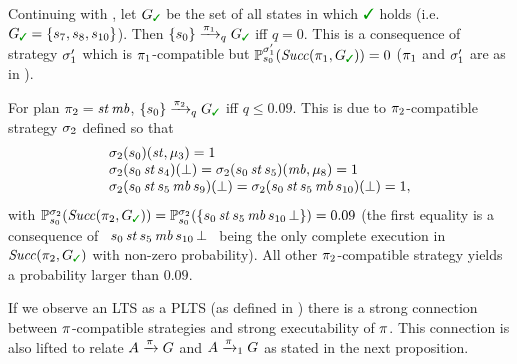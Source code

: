 \begin{example}\label{ex:running:plan-exec}
  Continuing with , let
  $G_{\goal}$
  be the set of all states in which $\goal$ holds (i.e. $G_{\goal} = \{s_7, s_8, s_{10}\}$).
  Then $\{s_0\}\reach{\plan_1}_qG_{\goal}$ iff $q=0$. This
  is a consequence of strategy $\sigma'_1$ which is
  $\pi_1$-compatible but
  $\Prob^{\strat'_1}_{s_0}(\Succ(\plan_1,G_{\goal}))=0$ ($\pi_1$ and
  $\sigma'_1$ are as in ).

  For plan $\pi_2 = \mathit{st}\,\mathit{mb}$,
  $\{s_0\}\reach{\plan_2}_qG_{\goal}$ iff $q\leq0.09$.  This is due to
  $\pi_2$-compatible strategy $\sigma_2$ defined so that
  \[
  \begin{array}{l}
    \sigma_2(s_0)(\mathit{st},\mu_3)=1\\
    \sigma_2(s_0\,\mathit{st}\,s_4)(\bot)=
    \sigma_2(s_0\,\mathit{st}\,s_5)(\mathit{mb},\mu_8)=1\\
    \sigma_2(s_0\,\mathit{st}\,s_5\,\mathit{mb}\,s_9)(\bot)=
    \sigma_2(s_0\,\mathit{st}\,s_5\,\mathit{mb}\,s_{10})(\bot)=1,
  \end{array}
  \]
  with 
  $\Prob^{\strat_2}_{s_0}(\Succ(\plan_2,G_{\goal}))=\Prob^{\strat_2}_{s_0}(\{s_0\,\stairs\,s_5\,\mobile\,s_{10}\,\complete\})=0.09$
  (the first equality is a consequence of \
  $s_0\,\mathit{st}\,s_5\,\mathit{mb}\,s_{10}\,\bot$ \ being the only
  complete execution in $\Succ(\plan_2,G_{\goal})$ with non-zero
  probability).
  All other $\pi_2$-compatible strategy yields a probability larger
  than $0.09$.
  
\end{example}

If we observe an LTS as a PLTS (as defined in
) there is a strong connection between
$\pi$-compatible strategies and strong executability of $\pi$.
This connection is also lifted to relate $A \xrightarrow{\pi} G$ and $A
\xrightarrow{\pi}_1 G$ as stated in the next proposition.


